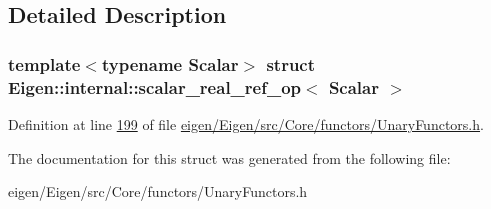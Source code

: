 \subsection{Detailed Description}
\subsubsection*{template$<$typename Scalar$>$\newline
struct Eigen\+::internal\+::scalar\+\_\+real\+\_\+ref\+\_\+op$<$ Scalar $>$}



Definition at line \hyperlink{eigen_2_eigen_2src_2_core_2functors_2_unary_functors_8h_source_l00199}{199} of file \hyperlink{eigen_2_eigen_2src_2_core_2functors_2_unary_functors_8h_source}{eigen/\+Eigen/src/\+Core/functors/\+Unary\+Functors.\+h}.



The documentation for this struct was generated from the following file\+:\begin{DoxyCompactItemize}
\item 
eigen/\+Eigen/src/\+Core/functors/\+Unary\+Functors.\+h\end{DoxyCompactItemize}
